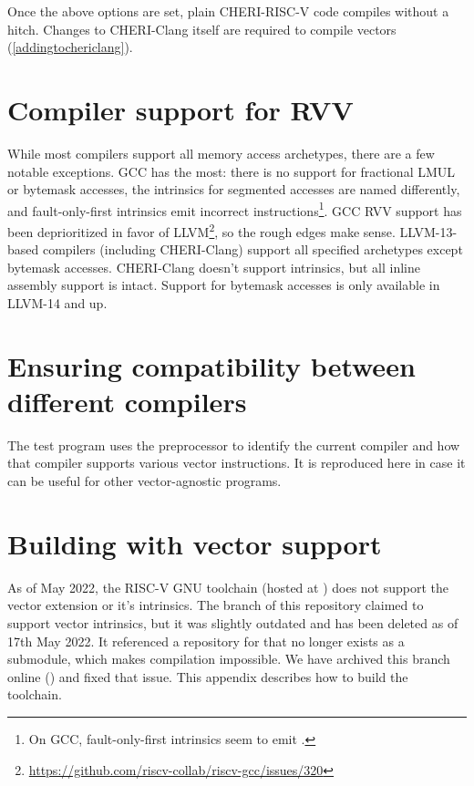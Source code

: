 Once the above options are set, plain CHERI-RISC-V code compiles without a hitch.
Changes to CHERI-Clang itself are required to compile vectors (\cref{addingtochericlang}).

\section{Compiler support for RVV}\label{compilerdifferences}
While most compilers support all memory access archetypes, there are a few notable exceptions.
GCC has the most: there is no support for fractional LMUL or bytemask accesses, the intrinsics for segmented accesses are named differently, and fault-only-first intrinsics emit incorrect instructions\footnote{On GCC, fault-only-first intrinsics seem to emit .}.
GCC RVV support has been deprioritized in favor of LLVM\footnote{\url{https://github.com/riscv-collab/riscv-gcc/issues/320}}, so the rough edges make sense.
LLVM-13-based compilers (including CHERI-Clang) support all specified archetypes except bytemask accesses.
CHERI-Clang doesn't support intrinsics, but all inline assembly support is intact.
Support for bytemask accesses is only available in LLVM-14 and up.

\pagebreak
\section{Ensuring compatibility between different compilers}
The  test program uses the preprocessor to identify the current compiler and how that compiler supports various vector instructions.
It is reproduced here in case it can be useful for other vector-agnostic programs.



\pagebreak
\section{Building  with vector support}\label{appx:building_rvv_gcc_toolchain}

As of May 2022, the RISC-V GNU toolchain (hosted at ) does not support the vector extension or it's intrinsics.
The  branch of this repository claimed to support vector intrinsics, but it was slightly outdated and has been deleted as of 17th May 2022.
It referenced a repository for  that no longer exists as a submodule, which makes compilation impossible.
We have archived this branch online () and fixed that issue.
This appendix describes how to build the toolchain.

